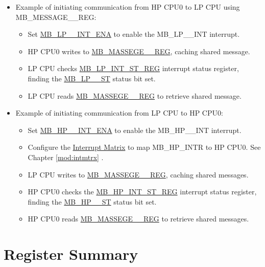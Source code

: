 \documentclass[main\_\_EN.tex]{subfiles}
\begin{document}
\begin{itemize}
    \item Example of initiating communication from HP CPU0 to LP CPU using MB\_MESSAGE\_\_REG:
    \begin{itemize}
        \item Set \hyperref[fielddesc:MBLP0INTENA]{MB\_LP\_\_INT\_ENA} to enable the MB\_LP\_\_INT interrupt.
        \item HP CPU0 writes to \hyperref[regdesc:MBMESSAGE0REG]{MB\_MASSEGE\_\_REG}, caching shared message.
        \item LP CPU checks \hyperref[regdesc:MBLPINTSTREG]{MB\_LP\_INT\_ST\_REG} interrupt status register, finding the  \hyperref[fielddesc:MBLP0INTST]{MB\_LP\_\_ST} status bit set.
        \item LP CPU reads \hyperref[regdesc:MBMESSAGE0REG]{MB\_MASSEGE\_\_REG} to retrieve shared message.
    \end{itemize}
    \item Example of initiating communication from LP CPU to HP CPU0:
    \begin{itemize}
        \item Set \hyperref[fielddesc:MBHP0INTENA]{MB\_HP\_\_INT\_ENA} to enable the MB\_HP\_\_INT interrupt.
        \item Configure the \hyperref[mod:intmtrx]{Interrupt Matrix} to map MB\_HP\_INTR to HP CPU0. See Chapter \ref{mod:intmtrx} \textit{}.
        \item LP CPU writes to \hyperref[regdesc:MBMESSAGE0REG]{MB\_MASSEGE\_\_REG}, caching shared messages.
        \item HP CPU0 checks the \hyperref[regdesc:MBHPINTSTREG]{MB\_HP\_INT\_ST\_REG} interrupt status register, finding the  \hyperref[fielddesc:MBHP0INTST]{MB\_HP\_\_ST} status bit set.
        \item HP CPU0 reads \hyperref[regdesc:MBMESSAGE0REG]{MB\_MASSEGE\_\_REG} to retrieve shared messages.
    \end{itemize}
\end{itemize}


\hypertarget{lpmailbox-reg-summ}{}
\section{Register Summary}
\label{sec:lpmailbox-reg-summ}
\end{document}
